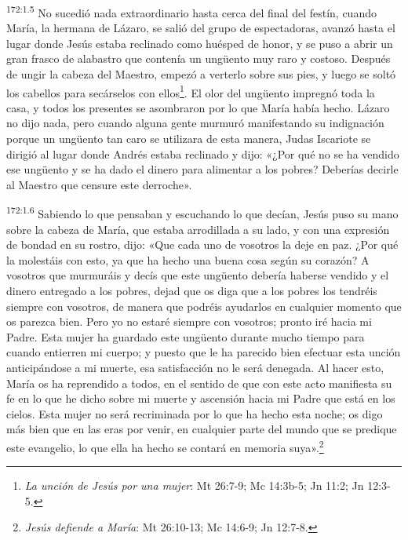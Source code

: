 \par
\textsuperscript{172:1.5} No sucedió nada extraordinario hasta cerca del final del festín, cuando María, la hermana de Lázaro, se salió del grupo de espectadoras, avanzó hasta el lugar donde Jesús estaba reclinado como huésped de honor, y se puso a abrir un gran frasco de alabastro que contenía un ung\"uento muy raro y costoso. Después de ungir la cabeza del Maestro, empezó a verterlo sobre sus pies, y luego se soltó los cabellos para secárselos con ellos\footnote{\textit{La unción de Jesús por una mujer}: Mt 26:7-9; Mc 14:3b-5; Jn 11:2; Jn 12:3-5.}. El olor del ung\"uento impregnó toda la casa, y todos los presentes se asombraron por lo que María había hecho. Lázaro no dijo nada, pero cuando alguna gente murmuró manifestando su indignación porque un ung\"uento tan caro se utilizara de esta manera, Judas Iscariote se dirigió al lugar donde Andrés estaba reclinado y dijo: «¿Por qué no se ha vendido ese ung\"uento y se ha dado el dinero para alimentar a los pobres? Deberías decirle al Maestro que censure este derroche».

\par
\textsuperscript{172:1.6} Sabiendo lo que pensaban y escuchando lo que decían, Jesús puso su mano sobre la cabeza de María, que estaba arrodillada a su lado, y con una expresión de bondad en su rostro, dijo: «Que cada uno de vosotros la deje en paz. ¿Por qué la molestáis con esto, ya que ha hecho una buena cosa según su corazón? A vosotros que murmuráis y decís que este ung\"uento debería haberse vendido y el dinero entregado a los pobres, dejad que os diga que a los pobres los tendréis siempre con vosotros, de manera que podréis ayudarlos en cualquier momento que os parezca bien. Pero yo no estaré siempre con vosotros; pronto iré hacia mi Padre. Esta mujer ha guardado este ung\"uento durante mucho tiempo para cuando entierren mi cuerpo; y puesto que le ha parecido bien efectuar esta unción anticipándose a mi muerte, esa satisfacción no le será denegada. Al hacer esto, María os ha reprendido a todos, en el sentido de que con este acto manifiesta su fe en lo que he dicho sobre mi muerte y ascensión hacia mi Padre que está en los cielos. Esta mujer no será recriminada por lo que ha hecho esta noche; os digo más bien que en las eras por venir, en cualquier parte del mundo que se predique este evangelio, lo que ella ha hecho se contará en memoria suya».\footnote{\textit{Jesús defiende a María}: Mt 26:10-13; Mc 14:6-9; Jn 12:7-8.}

